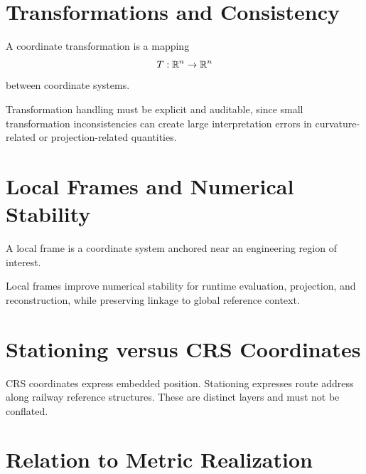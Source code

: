 \section{Transformations and Consistency}

\begin{definition}
A coordinate transformation is a mapping
\[
T:\mathbb{R}^n\rightarrow\mathbb{R}^n
\]
between coordinate systems.
\end{definition}

Transformation handling must be explicit and auditable, since small
transformation inconsistencies can create large interpretation errors in
curvature-related or projection-related quantities.

\section{Local Frames and Numerical Stability}

\begin{definition}
A local frame is a coordinate system anchored near an engineering region
of interest.
\end{definition}

Local frames improve numerical stability for runtime evaluation,
projection, and reconstruction, while preserving linkage to global
reference context.

\section{Stationing versus CRS Coordinates}


CRS coordinates express embedded position. Stationing expresses route
address along railway reference structures. These are distinct layers
and must not be conflated.

\section{Relation to Metric Realization}


